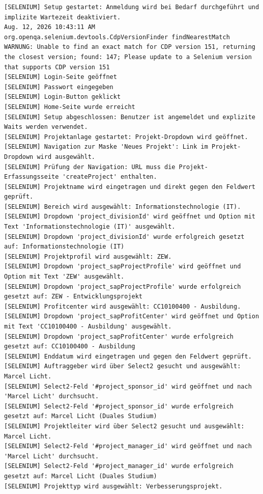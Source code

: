 \begin{lstlisting}[caption={Selenium -- Neues Projekt (Erfolgreich)}, label={lst:sel_new_proj_ok}, style=logStyle]
[SELENIUM] Setup gestartet: Anmeldung wird bei Bedarf durchgeführt und implizite Wartezeit deaktiviert.
Aug. 12, 2026 10:43:11 AM org.openqa.selenium.devtools.CdpVersionFinder findNearestMatch
WARNUNG: Unable to find an exact match for CDP version 151, returning the closest version; found: 147; Please update to a Selenium version that supports CDP version 151
[SELENIUM] Login-Seite geöffnet
[SELENIUM] Passwort eingegeben
[SELENIUM] Login-Button geklickt
[SELENIUM] Home-Seite wurde erreicht
[SELENIUM] Setup abgeschlossen: Benutzer ist angemeldet und explizite Waits werden verwendet.
[SELENIUM] Projektanlage gestartet: Projekt-Dropdown wird geöffnet.
[SELENIUM] Navigation zur Maske 'Neues Projekt': Link im Projekt-Dropdown wird ausgewählt.
[SELENIUM] Prüfung der Navigation: URL muss die Projekt-Erfassungsseite 'createProject' enthalten.
[SELENIUM] Projektname wird eingetragen und direkt gegen den Feldwert geprüft.
[SELENIUM] Bereich wird ausgewählt: Informationstechnologie (IT).
[SELENIUM] Dropdown 'project_divisionId' wird geöffnet und Option mit Text 'Informationstechnologie (IT)' ausgewählt.
[SELENIUM] Dropdown 'project_divisionId' wurde erfolgreich gesetzt auf: Informationstechnologie (IT)
[SELENIUM] Projektprofil wird ausgewählt: ZEW.
[SELENIUM] Dropdown 'project_sapProjectProfile' wird geöffnet und Option mit Text 'ZEW' ausgewählt.
[SELENIUM] Dropdown 'project_sapProjectProfile' wurde erfolgreich gesetzt auf: ZEW - Entwicklungsprojekt
[SELENIUM] Profitcenter wird ausgewählt: CC10100400 - Ausbildung.
[SELENIUM] Dropdown 'project_sapProfitCenter' wird geöffnet und Option mit Text 'CC10100400 - Ausbildung' ausgewählt.
[SELENIUM] Dropdown 'project_sapProfitCenter' wurde erfolgreich gesetzt auf: CC10100400 - Ausbildung
[SELENIUM] Enddatum wird eingetragen und gegen den Feldwert geprüft.
[SELENIUM] Auftraggeber wird über Select2 gesucht und ausgewählt: Marcel Licht.
[SELENIUM] Select2-Feld '#project_sponsor_id' wird geöffnet und nach 'Marcel Licht' durchsucht.
[SELENIUM] Select2-Feld '#project_sponsor_id' wurde erfolgreich gesetzt auf: Marcel Licht (Duales Studium)
[SELENIUM] Projektleiter wird über Select2 gesucht und ausgewählt: Marcel Licht.
[SELENIUM] Select2-Feld '#project_manager_id' wird geöffnet und nach 'Marcel Licht' durchsucht.
[SELENIUM] Select2-Feld '#project_manager_id' wurde erfolgreich gesetzt auf: Marcel Licht (Duales Studium)
[SELENIUM] Projekttyp wird ausgewählt: Verbesserungsprojekt.

\end{lstlisting}

